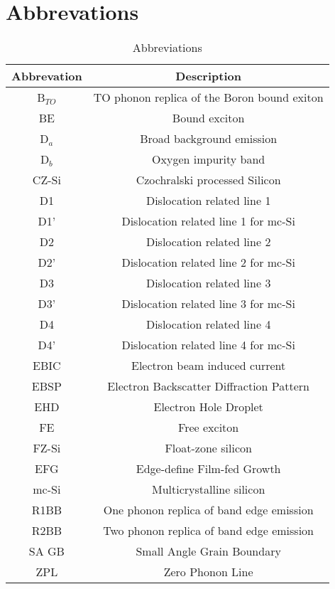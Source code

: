 		\section{Abbrevations}
		
		\begin{table}[H]
\centering
\begin{tabular}{|c|c|}
\hline

		\textbf{Abbrevation} & \textbf{Description} \\ \hline
		B$_{TO}$ & TO phonon replica of the Boron bound exiton \cite{sugimoto07} \\ \hline
		BE & Bound exciton \\ \hline
		D$_a$ & Broad background emission \cite{tajima95} \\ \hline
		D$_b$ & Oxygen impurity band \cite{tajima95} \\ \hline
		CZ-Si & Czochralski processed Silicon \\ \hline
		D1	& Dislocation related line 1 \cite{drozdov76} \\ \hline
		D1' & Dislocation related line 1 for mc-Si \cite{tarasov00} \\ \hline
		D2	& Dislocation related line 2 \cite{drozdov76} \\ \hline
		D2' & Dislocation related line 2 for mc-Si \cite{tarasov00} \\ \hline
		D3	& Dislocation related line 3 \cite{drozdov76} \\ \hline
		D3' & Dislocation related line 3 for mc-Si \cite{tarasov00} \\ \hline
		D4	& Dislocation related line 4 \cite{drozdov76} \\ \hline
		D4' & Dislocation related line 4 for mc-Si \cite{tarasov00} \\ \hline
		EBIC & Electron beam induced current \cite{arguirov03} \\ \hline
		EBSP & Electron Backscatter Diffraction Pattern \cite{sugimoto07} \\ \hline
		EHD & Electron Hole Droplet	\\ \hline
		FE & Free exciton \\ \hline
		FZ-Si & Float-zone silicon \\ \hline
		EFG & Edge-define Film-fed Growth \\ \hline
		mc-Si & Multicrystalline silicon \\ \hline
		R1BB & One phonon replica of band edge emission \cite{arguirov03} \\ \hline
		R2BB & Two phonon replica of band edge emission \cite{arguirov03} \\ \hline
		SA GB & Small Angle Grain Boundary \\ \hline
		ZPL & Zero Phonon Line \cite{calao88} \\ \hline

		\end{tabular}
\caption{Abbreviations}
\label{abbreviations}
\end{table}
		
		
